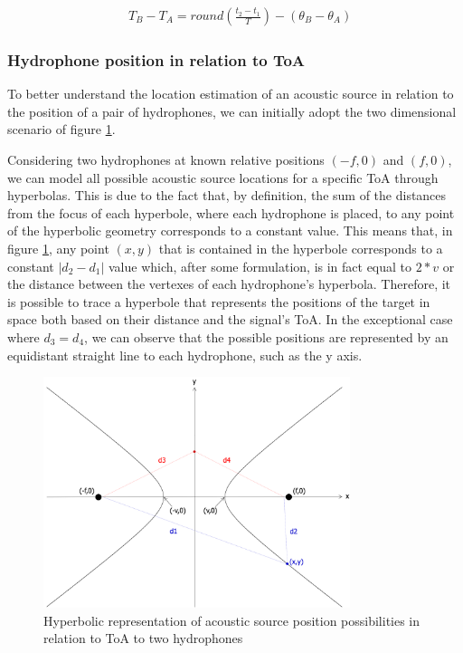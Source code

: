 \begin{eqnarray}
& T_B - T_A = round(\frac{t_2-t_1}{T}) - (\theta_B - \theta_A)
\label{eq:phase-amb}
\end{eqnarray}

\subsubsection{Hydrophone position in relation to ToA}
To better understand the location estimation of an acoustic source in relation to the position of a pair of hydrophones, we can initially adopt the two dimensional scenario of figure \ref{fig:hyper}. 

Considering two hydrophones at known relative positions $(-f,0)$ and $(f,0)$, we can model all possible acoustic source locations for a specific ToA through hyperbolas. This is due to the fact that, by definition, the sum of the distances from the focus of each hyperbole, where each hydrophone is placed, to any point of the hyperbolic geometry corresponds to a constant value. 
This means that, in figure \ref{fig:hyper}, any point $(x,y)$ that is contained in the hyperbole corresponds to a constant $|d_2-d_1|$ value which, after some formulation, is in fact equal to $2*v$ or the distance between the vertexes of each hydrophone's hyperbola. Therefore, it is possible to trace a hyperbole that represents the positions of the target in space both based on their distance and the signal's ToA. In the exceptional case where $d_3=d_4$, we can observe that the possible positions are represented by an equidistant straight line to each hydrophone, such as the y axis.

\begin{figure}[!htbp]
	\centering
	\includegraphics[width=0.8\textwidth]{figures/hyperbole-dist}
	\captionsetup{justification=centering,margin=2cm}
	\caption{Hyperbolic representation of acoustic source position possibilities in relation to ToA to two hydrophones}
	\label{fig:hyper}
\end{figure}

